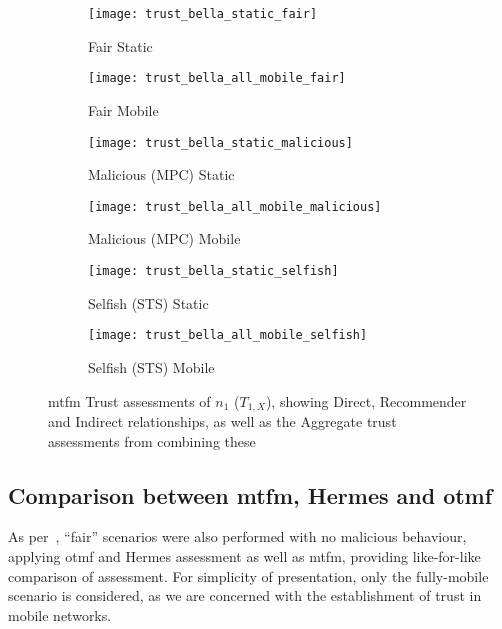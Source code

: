 \begin{figure}[h]
	\centering
	\begin{subfigure}{0.5\textwidth}
		\caption{Fair Static}
		\texttt{[image: trust\_bella\_static\_fair]} 
		\label{fig:trust_static}
	\end{subfigure}%
	\begin{subfigure}{0.5\textwidth}
		\caption{Fair Mobile}
		\texttt{[image: trust\_bella\_all\_mobile\_fair]}  
		\label{fig:trust_all_mobile}
	\end{subfigure}%
	
	\begin{subfigure}{0.5\textwidth}
		\caption{Malicious (MPC) Static}
		\texttt{[image: trust\_bella\_static\_malicious]} 
		\label{fig:trust_static_mal}
	\end{subfigure}%
	\begin{subfigure}{0.5\textwidth}
		\caption{Malicious (MPC) Mobile}
		\texttt{[image: trust\_bella\_all\_mobile\_malicious]}  
		\label{fig:trust_all_mobile_mal}
	\end{subfigure}%
	
	\begin{subfigure}{0.5\textwidth}
		\caption{Selfish (STS) Static}
		\texttt{[image: trust\_bella\_static\_selfish]}
		\label{fig:trust_static_sel}
	\end{subfigure}%
	\begin{subfigure}{0.5\textwidth}
		\caption{Selfish (STS) Mobile}
		\texttt{[image: trust\_bella\_all\_mobile\_selfish]}  \label{fig:trust_all_mobile_sel}
	\end{subfigure}%
	
	\caption{\gls{mtfm} Trust assessments of $n_1$ ($T_{1,X}$), showing Direct, Recommender and Indirect relationships, as well as the Aggregate trust assessments from combining these} 
	\label{fig:trust_mobility}
\end{figure}
%

\subsection{Comparison between \gls{mtfm}, Hermes and \gls{otmf}}
As per~\cite{Guo11}, ``fair'' scenarios were also performed with no malicious behaviour, applying \gls{otmf} and Hermes assessment as well as \gls{mtfm}, providing like-for-like comparison of assessment.
For simplicity of presentation, only the fully-mobile scenario is considered, as we are concerned with the establishment of trust in mobile networks.

